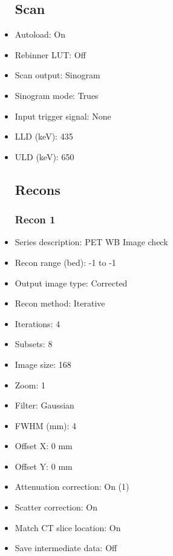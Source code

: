 \documentclass[12pt]{article}
\begin{document}
\begin{itemize}
\subsection{Scan}
\item Autoload: On
\item Rebinner LUT: Off
\item Scan output: Sinogram
\item Sinogram mode: Trues
\item Input trigger signal: None
\item LLD (keV): 435
\item ULD (keV): 650
\subsection{Recons}
\subsubsection{Recon 1}
\item Series description: PET WB Image check 
\item Recon range (bed): -1 to -1
\item Output image type: Corrected
\item Recon method: Iterative
\item Iterations: 4
\item Subsets: 8
\item Image size: 168
\item Zoom: 1
\item Filter: Gaussian
\item FWHM (mm): 4
\item Offset X: 0 mm
\item Offset Y: 0 mm
\item Attenuation correction: On (1)
\item Scatter correction: On
\item Match CT slice location: On
\item Save intermediate data: Off

\end{itemize}
\end{document}
